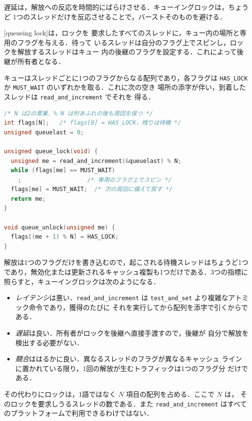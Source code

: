 \documentclass[../main.tex]{subfiles}
\begin{document}
遅延は，解放への反応を時間的にばらけさせる．キューイングロックは，ちょうど
1つのスレッドだけを反応させることで，バーストそのものを避ける．

\begin{definition}[キューイングロック]
  [queueing lock]は，ロックを
  要求したすべてのスレッドに，キュー内の場所と専用のフラグを与える．待って
  いるスレッドは自分のフラグ上でスピンし，ロックを解放するスレッドはキュー
  内の後継のフラグを設定する．これによって後継が所有者となる．
\end{definition}

キューはスレッドごとに1つのフラグからなる配列であり，各フラグは
\texttt{HAS\_LOCK} か \texttt{MUST\_WAIT} のいずれかを取る．これに次の空き
場所の添字が伴い，到着したスレッドは \texttt{read\_and\_increment} でそれを
得る．
\begin{lstlisting}[language=C, numbers=none]
/* N は2の累乗．% N は桁あふれの後も周回を保つ */
int flags[N];   /* flags[0] = HAS_LOCK，残りは待機 */
unsigned queuelast = 0;

unsigned queue_lock(void) {
  unsigned me = read_and_increment(&queuelast) % N;
  while (flags[me] == MUST_WAIT)
    ;                   /* 専用のフラグ上でスピン */
  flags[me] = MUST_WAIT;  /* 次の周回に備えて戻す */
  return me;
}

void queue_unlock(unsigned me) {
  flags[(me + 1) % N] = HAS_LOCK;
}
\end{lstlisting}
解放は1つのフラグだけを書き込むので，起こされる待機スレッドはちょうど1つ
であり，無効化または更新されるキャッシュ複製も1つだけである．3つの指標に
照らすと，キューイングロックは次のようになる．
\begin{itemize}
  \item \emph{レイテンシ}は悪い．\texttt{read\_and\_increment} は
    \texttt{test\_and\_set} より複雑なアトミック命令であり，獲得のたびに
    それを実行してから配列を添字で引くからである．
  \item \emph{遅延}は良い．所有者がロックを後継へ直接手渡すので，後継が
    自分で解放を検出する必要がない．
  \item \emph{競合}ははるかに良い．異なるスレッドのフラグが異なるキャッシュ
    ラインに置かれている限り，1回の解放が生むトラフィックは1つのフラグ分
    だけである．
\end{itemize}
その代わりにロックは，1語ではなく $N$ 項目の配列を占める．ここで $N$ は，
そのロックを要求しうるスレッドの数である．また \texttt{read\_and\_increment}
はすべてのプラットフォームで利用できるわけではない．
\end{document}
